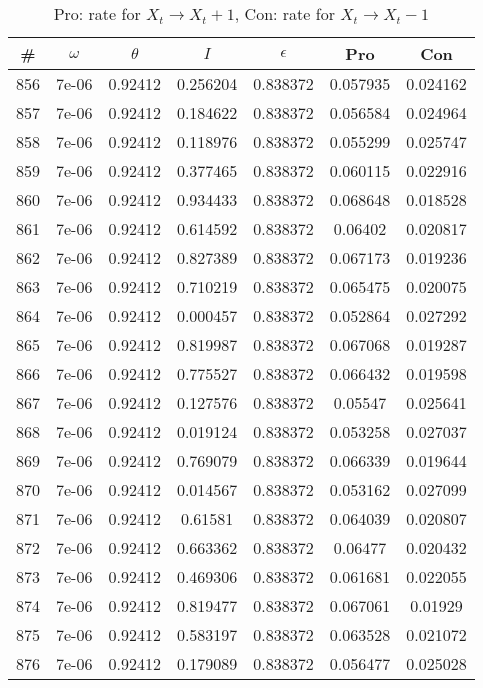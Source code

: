 \newpage
\begin{table}
\caption{Pro: rate for $X_t \rightarrow X_t + 1$, Con: rate for $X_t \rightarrow X_t - 1$}
\begin{tabular*}{\linewidth}{c|c|c|c|c|c|c}
\# & $\omega$ & $\theta$ & $I$ & $\epsilon$ & Pro & Con \\
\hline
856 & 7e-06 & 0.92412 & 0.256204 & 0.838372 & 0.057935 & 0.024162\\
857 & 7e-06 & 0.92412 & 0.184622 & 0.838372 & 0.056584 & 0.024964\\
858 & 7e-06 & 0.92412 & 0.118976 & 0.838372 & 0.055299 & 0.025747\\
859 & 7e-06 & 0.92412 & 0.377465 & 0.838372 & 0.060115 & 0.022916\\
860 & 7e-06 & 0.92412 & 0.934433 & 0.838372 & 0.068648 & 0.018528\\
861 & 7e-06 & 0.92412 & 0.614592 & 0.838372 & 0.06402 & 0.020817\\
862 & 7e-06 & 0.92412 & 0.827389 & 0.838372 & 0.067173 & 0.019236\\
863 & 7e-06 & 0.92412 & 0.710219 & 0.838372 & 0.065475 & 0.020075\\
864 & 7e-06 & 0.92412 & 0.000457 & 0.838372 & 0.052864 & 0.027292\\
865 & 7e-06 & 0.92412 & 0.819987 & 0.838372 & 0.067068 & 0.019287\\
866 & 7e-06 & 0.92412 & 0.775527 & 0.838372 & 0.066432 & 0.019598\\
867 & 7e-06 & 0.92412 & 0.127576 & 0.838372 & 0.05547 & 0.025641\\
868 & 7e-06 & 0.92412 & 0.019124 & 0.838372 & 0.053258 & 0.027037\\
869 & 7e-06 & 0.92412 & 0.769079 & 0.838372 & 0.066339 & 0.019644\\
870 & 7e-06 & 0.92412 & 0.014567 & 0.838372 & 0.053162 & 0.027099\\
871 & 7e-06 & 0.92412 & 0.61581 & 0.838372 & 0.064039 & 0.020807\\
872 & 7e-06 & 0.92412 & 0.663362 & 0.838372 & 0.06477 & 0.020432\\
873 & 7e-06 & 0.92412 & 0.469306 & 0.838372 & 0.061681 & 0.022055\\
874 & 7e-06 & 0.92412 & 0.819477 & 0.838372 & 0.067061 & 0.01929\\
875 & 7e-06 & 0.92412 & 0.583197 & 0.838372 & 0.063528 & 0.021072\\
876 & 7e-06 & 0.92412 & 0.179089 & 0.838372 & 0.056477 & 0.025028\\

\end{tabular*}
\end{table}
